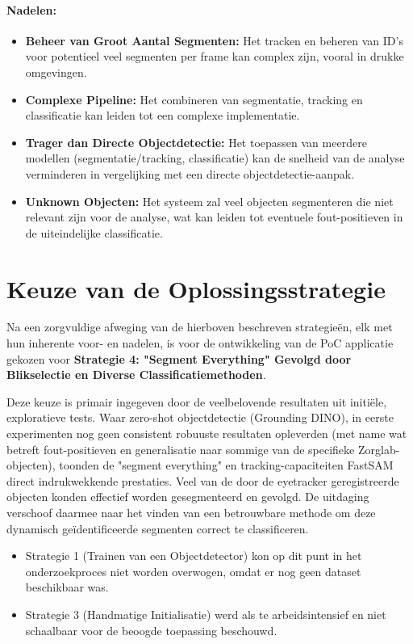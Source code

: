 \paragraph{Nadelen:}
\begin{itemize}
    \item \textbf{Beheer van Groot Aantal Segmenten:} Het tracken en beheren van ID's voor potentieel veel segmenten per frame kan complex zijn, vooral in drukke omgevingen.
    \item \textbf{Complexe Pipeline:} Het combineren van segmentatie, tracking en classificatie kan leiden tot een complexe implementatie.
    \item \textbf{Trager dan Directe Objectdetectie:} Het toepassen van meerdere modellen (segmentatie/tracking, classificatie) kan de snelheid van de analyse verminderen in vergelijking met een directe objectdetectie-aanpak.
    \item \textbf{Unknown Objecten:} Het systeem zal veel objecten segmenteren die niet relevant zijn voor de analyse, wat kan leiden tot eventuele fout-positieven in de uiteindelijke classificatie.
\end{itemize}

\section{Keuze van de Oplossingsstrategie}

Na een zorgvuldige afweging van de hierboven beschreven strategieën, elk met hun inherente voor- en nadelen, is voor de ontwikkeling van de PoC 
applicatie gekozen voor \textbf{Strategie 4: "Segment Everything" Gevolgd door Blikselectie en Diverse Classificatiemethoden}.

Deze keuze is primair ingegeven door de veelbelovende resultaten uit initiële, exploratieve tests. 
Waar zero-shot objectdetectie (Grounding DINO), in eerste experimenten nog geen consistent robuuste resultaten opleverden 
(met name wat betreft fout-positieven en generalisatie naar sommige van de specifieke Zorglab-objecten), 
toonden de "segment everything" en tracking-capaciteiten FastSAM direct indrukwekkende prestaties.
Veel van de door de eyetracker geregistreerde objecten konden effectief worden gesegmenteerd en gevolgd. 
De uitdaging verschoof daarmee naar het vinden van een betrouwbare methode om deze dynamisch geïdentificeerde segmenten correct te classificeren.

\begin{itemize}
    \item Strategie 1 (Trainen van een Objectdetector) kon op dit punt in het onderzoekproces niet worden overwogen, omdat er nog geen dataset beschikbaar was.
    \item Strategie 3 (Handmatige Initialisatie) werd als te arbeidsintensief en niet schaalbaar voor de beoogde toepassing beschouwd.
\end{itemize}

